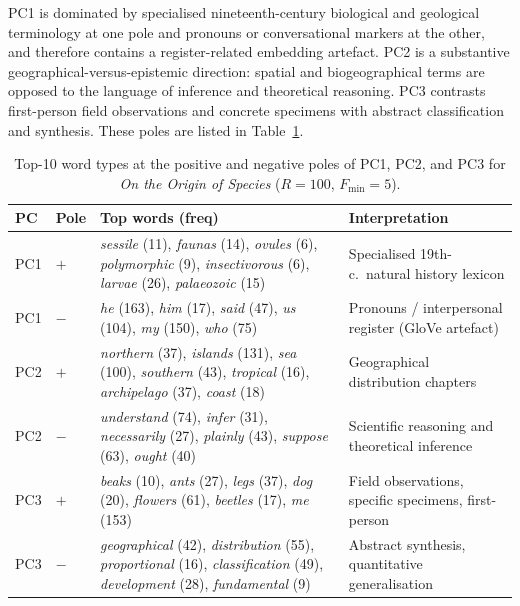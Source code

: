 \documentclass[12pt,a4paper]{article}
\begin{document}
PC1 is dominated by specialised nineteenth-century biological and
geological terminology at one pole and pronouns or conversational
markers at the other, and therefore contains a register-related
embedding artefact. PC2 is a substantive geographical-versus-epistemic
direction: spatial and biogeographical terms are opposed to the
language of inference and theoretical reasoning. PC3 contrasts
first-person field observations and concrete specimens with abstract
classification and synthesis. These poles are listed in Table~\ref{tab:darwin_pc}.

\begin{table}[htbp]
\centering
\caption{Top-10 word types at the positive and negative poles
of PC1, PC2, and PC3 for \emph{On the Origin of Species}
($R=100$, $F_{\min}=5$).}
\label{tab:darwin_pc}
\small
\setlength{\tabcolsep}{4pt}
\begin{tabular}{ll p{6cm} p{5.5cm}}
\toprule
PC & Pole & Top words (freq) & Interpretation \\
\midrule
PC1 & $+$ &
  \emph{sessile} (11), \emph{faunas} (14), \emph{ovules} (6),
  \emph{polymorphic} (9), \emph{insectivorous} (6),
  \emph{larvae} (26), \emph{palaeozoic} (15)
  & Specialised 19th-c.\ natural history lexicon \\
PC1 & $-$ &
  \emph{he} (163), \emph{him} (17), \emph{said} (47),
  \emph{us} (104), \emph{my} (150), \emph{who} (75)
  & Pronouns / interpersonal register (GloVe artefact) \\
\midrule
PC2 & $+$ &
  \emph{northern} (37), \emph{islands} (131), \emph{sea} (100),
  \emph{southern} (43), \emph{tropical} (16),
  \emph{archipelago} (37), \emph{coast} (18)
  & Geographical distribution chapters \\
PC2 & $-$ &
  \emph{understand} (74), \emph{infer} (31),
  \emph{necessarily} (27), \emph{plainly} (43),
  \emph{suppose} (63), \emph{ought} (40)
  & Scientific reasoning and theoretical inference \\
\midrule
PC3 & $+$ &
  \emph{beaks} (10), \emph{ants} (27), \emph{legs} (37),
  \emph{dog} (20), \emph{flowers} (61),
  \emph{beetles} (17), \emph{me} (153)
  & Field observations, specific specimens, first-person \\
PC3 & $-$ &
  \emph{geographical} (42), \emph{distribution} (55),
  \emph{proportional} (16), \emph{classification} (49),
  \emph{development} (28), \emph{fundamental} (9)
  & Abstract synthesis, quantitative generalisation \\
\bottomrule
\end{tabular}
\end{table}
\end{document}
